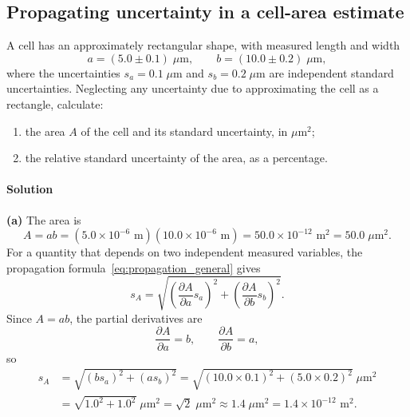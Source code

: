 \subsection{Propagating uncertainty in a cell-area estimate}
\label{ex:cell_area}

A cell has an approximately rectangular shape, with measured length and width
\begin{equation*}
a = (5.0 \pm 0.1)\;\mu\text{m}, \qquad b = (10.0 \pm 0.2)\;\mu\text{m},
\end{equation*}
where the uncertainties $s_a = 0.1\;\mu\text{m}$ and $s_b = 0.2\;\mu\text{m}$ are independent standard uncertainties. Neglecting any uncertainty due to approximating the cell as a rectangle, calculate:
\begin{enumerate}[label=(\alph*)]
    \item the area $A$ of the cell and its standard uncertainty, in $\mu\text{m}^2$;
    \item the relative standard uncertainty of the area, as a percentage.
\end{enumerate}

\paragraph{Solution} \textbf{(a)} The area is
\begin{equation*}
A = ab = (5.0 \times 10^{-6}\text{ m})(10.0 \times 10^{-6}\text{ m}) = 50.0 \times 10^{-12}\text{ m}^2 = 50.0\;\mu\text{m}^2.
\end{equation*}
For a quantity that depends on two independent measured variables, the propagation formula~\eqref{eq:propagation_general} gives
\begin{equation*}
s_A = \sqrt{\left(\frac{\partial A}{\partial a}s_a\right)^2 + \left(\frac{\partial A}{\partial b}s_b\right)^2}.
\end{equation*}
Since $A = ab$, the partial derivatives are
\begin{equation*}
\frac{\partial A}{\partial a} = b, \qquad \frac{\partial A}{\partial b} = a,
\end{equation*}
so
\begin{align*}
s_A &= \sqrt{(bs_a)^2 + (as_b)^2} = \sqrt{(10.0 \times 0.1)^2 + (5.0 \times 0.2)^2}\;\mu\text{m}^2 \\
&= \sqrt{1.0^2 + 1.0^2}\;\mu\text{m}^2 = \sqrt{2}\;\mu\text{m}^2 \approx 1.4\;\mu\text{m}^2 = 1.4 \times 10^{-12}\text{ m}^2.
\end{align*}

